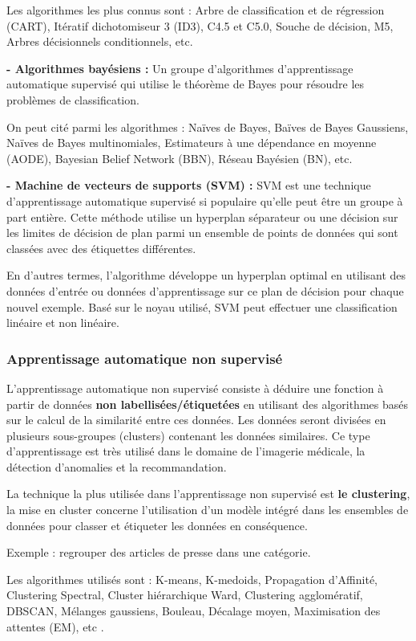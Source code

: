 Les algorithmes les plus connus sont : Arbre de classification et de régression (CART), Itératif dichotomiseur 3 (ID3), C4.5 et C5.0, Souche de décision, M5, Arbres décisionnels conditionnels, etc.

\textbf{- Algorithmes bayésiens :} Un groupe d'algorithmes d'apprentissage automatique supervisé qui utilise le théorème de Bayes pour résoudre les problèmes de classification.

On peut cité parmi les algorithmes : Naïves de Bayes, Baïves de Bayes Gaussiens, Naïves de Bayes multinomiales, Estimateurs à une dépendance en moyenne (AODE), Bayesian Belief Network (BBN), Réseau Bayésien (BN), etc.

\textbf{- Machine de vecteurs de supports (SVM) :} SVM est une technique d'apprentissage automatique supervisé si populaire qu'elle peut être un groupe à part entière. Cette méthode utilise un hyperplan séparateur ou une décision sur les limites de décision de plan parmi un ensemble de points de données qui sont classées avec des étiquettes différentes.

En d'autres termes, l'algorithme développe un hyperplan optimal en utilisant des données d'entrée ou données d'apprentissage sur ce plan de décision pour chaque nouvel exemple. Basé sur le noyau utilisé, SVM peut effectuer une classification linéaire et non linéaire.

\subsubsection{Apprentissage automatique non supervisé}
L'apprentissage automatique non supervisé consiste à déduire une fonction à partir de données \textbf{non labellisées/étiquetées} en utilisant des algorithmes basés sur le calcul de la similarité entre ces données. Les données seront divisées en plusieurs sous-groupes (clusters) contenant les données similaires.
Ce type d'apprentissage est très utilisé dans le domaine de l'imagerie médicale, la détection d'anomalies et la recommandation.

La technique la plus utilisée dans l'apprentissage non supervisé est \textbf{le clustering}, la mise en cluster concerne l'utilisation d'un modèle intégré dans les ensembles de données pour classer et étiqueter les données en conséquence.

Exemple : regrouper des articles de presse dans une catégorie.

Les algorithmes utilisés sont : K-means, K-medoids, Propagation d'Affinité, Clustering Spectral, Cluster hiérarchique Ward, Clustering agglomératif, DBSCAN, Mélanges gaussiens, Bouleau, Décalage moyen, Maximisation des attentes (EM), etc \cite{surveymachinelearningregression}.


